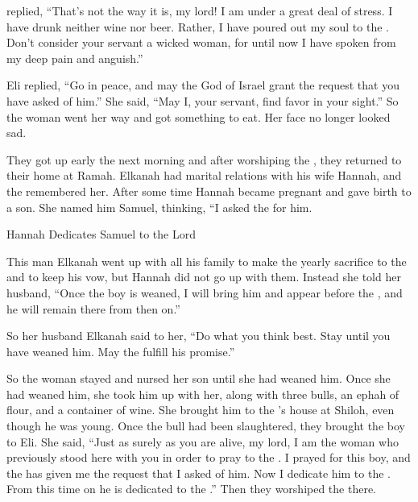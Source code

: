{replied,
“That’s not
the way it is, my lord! I am under a great deal of stress.
I
have drunk
neither wine
nor beer.
Rather, I have poured out
my soul
to
the {}.
Don’t
consider
your servant
a wicked
woman,
for until
now
I have spoken
from my deep
pain
and anguish.”
\par }{\PP {}Eli
replied,
“Go
in peace,
and may the God
of Israel
grant
the request
that
you have asked of him.”
She said,
“May I, your servant,
find
favor
in your sight.”
So the woman
went
her way
and got something to eat.
Her face
no
longer looked sad.
\par }{\PP {}They got up early
the next morning
and after worshiping
the {}, they returned
to
their home
at Ramah.
Elkanah
had marital relations
with his wife
Hannah,
and the
{}
remembered her.
After some time
Hannah
became pregnant
and gave birth
to a son.
She named
him Samuel,
thinking, “I asked
the {}
for him.
\par }{\SH Hannah Dedicates Samuel to the Lord
\par }{\PP {}This man
Elkanah
went up
with all
his family
to make the yearly
sacrifice
to the
{}
and to keep his vow,
but Hannah
did not
go up
with them. Instead
she told
her husband,
“Once the boy
is weaned,
I will bring
him and appear
before
the {}, and he will remain
there
from then on.”
\par }{\PP {}So her husband
Elkanah
said
to her, “Do
what you think
best.
Stay
until
you have weaned
him. May
the {}
fulfill
his promise.”
\par }{\PP So
the woman
stayed
and nursed
her son
until
she had weaned him.
Once she had weaned
him, she took
him up
with
her, along with three
bulls,
an ephah
of flour,
and a container
of wine.
She brought
him to the
{}’s
house
at Shiloh,
even though he was young.
Once the bull
had been slaughtered,
they brought
the boy
to
Eli.
She said,
“Just as surely
as you
are alive,
my lord,
I am
the woman
who previously stood
here
with
you in order to pray
to
the {}.
I prayed
for this
boy,
and the
{}
has given
me the request
that
I asked
of him.
Now
I
dedicate
him to the
{}. From this time
on he is
dedicated
to the
{}.” Then they worshiped
the {}
there.

\par }

